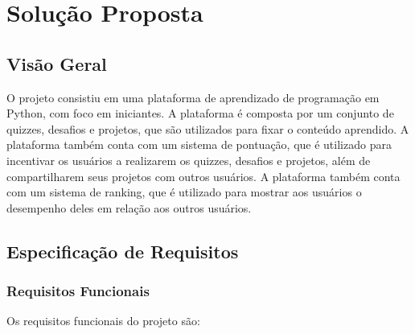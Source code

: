 \chapter{Solução Proposta}

\section{Visão Geral}

O projeto consistiu em uma plataforma de aprendizado de programação em Python, com foco em iniciantes. A plataforma é composta por um conjunto de quizzes, desafios e projetos, que são utilizados para fixar o conteúdo aprendido. A plataforma também conta com um sistema de pontuação, que é utilizado para incentivar os usuários a realizarem os quizzes, desafios e projetos, além de compartilharem seus projetos com outros usuários. A plataforma também conta com um sistema de ranking, que é utilizado para mostrar aos usuários o desempenho deles em relação aos outros usuários.

\section{Especificação de Requisitos}

\subsection{Requisitos Funcionais}

Os requisitos funcionais do projeto são:


